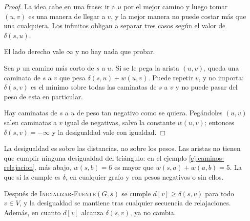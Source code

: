 \documentclass[11pt,letterpaper]{article}
\begin{document}
\begin{proof}
  La idea cabe en una frase: ir a $u$ por el mejor camino y luego
  tomar $(u, v)$ es una manera de llegar a $v$, y la mejor manera no
  puede costar más que una cualquiera. Los infinitos obligan a separar
  tres casos según el valor de $\delta(s, u)$.

   El lado derecho vale $\infty$ y no
  hay nada que probar.

   Sea $p$ un camino más corto de $s$ a
  $u$. Si se le pega la arista $(u, v)$, queda una caminata de $s$ a
  $v$ que pesa $\delta(s, u) + w(u, v)$. Puede repetir $v$, y no
  importa: $\delta(s, v)$ es el mínimo sobre todas las caminatas de
  $s$ a $v$ y no puede pasar del peso de esta en particular.

   Hay caminatas de $s$ a $u$ de peso
  tan negativo como se quiera. Pegándoles $(u, v)$ salen caminatas a
  $v$ igual de negativas, salvo la constante $w(u, v)$; entonces
  $\delta(s, v) = -\infty$ y la desigualdad vale con igualdad.
\end{proof}

\begin{ojo}
  La desigualdad es sobre las distancias, no sobre los pesos. Las
  aristas no tienen que cumplir ninguna desigualdad del triángulo: en
  el ejemplo \ref{ej:caminos-relajacion}, más abajo, $w(s, b) = 6$ es
  mayor que $w(s, a) + w(a, b) = 5$. La que sí la cumple es $\delta$,
  en cualquier grafo y con pesos negativos o sin ellos.
\end{ojo}

\begin{lema}
  \label{lem:prueba-cota-superior}
  Después de \textsc{Inicializar-Fuente}$(G, s)$ se cumple
  $d[v] \ge \delta(s, v)$ para todo $v \in V$, y la desigualdad se
  mantiene tras cualquier secuencia de relajaciones. Además, en cuanto
  $d[v]$ alcanza $\delta(s, v)$, ya no cambia.
\end{lema}
\end{document}
